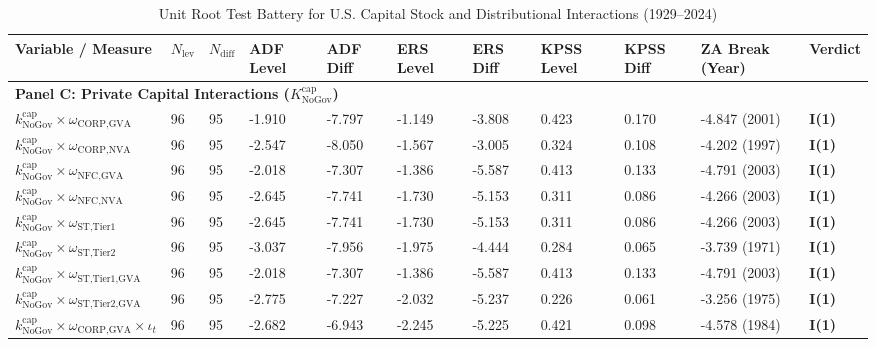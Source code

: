 \documentclass[11pt,a4paper]{article}
\begin{document}
\begin{landscape}
\begin{table}[h!]
\centering
\footnotesize
\caption{Unit Root Test Battery for U.S. Capital Stock and Distributional Interactions (1929--2024)}
\label{tab:urca_results_kcap}
\begin{tabular}{p{6.0cm} p{0.6cm} p{0.6cm} p{1.5cm} p{1.5cm} p{1.5cm} p{1.5cm} p{1.5cm} p{1.5cm} p{2.2cm} p{2.2cm}}
\toprule
\textbf{Variable / Measure} & \textbf{$N_{\text{lev}}$} & \textbf{$N_{\text{diff}}$} & \textbf{ADF Level} & \textbf{ADF Diff} & \textbf{ERS Level} & \textbf{ERS Diff} & \textbf{KPSS Level} & \textbf{KPSS Diff} & \textbf{ZA Break (Year)} & \textbf{Verdict} \\
\midrule
\multicolumn{11}{l}{\textbf{Panel C: Private Capital Interactions ($K^{\text{cap}}_{\text{NoGov}}$)}} \\
\midrule
$k^{\text{cap}}_{\text{NoGov}} \times \omega_{\text{CORP,GVA}}$ & 96 & 95 & -1.910 & -7.797 & -1.149 & -3.808 & 0.423 & 0.170 & -4.847 (2001) & \textbf{I(1)} \\
$k^{\text{cap}}_{\text{NoGov}} \times \omega_{\text{CORP,NVA}}$ & 96 & 95 & -2.547 & -8.050 & -1.567 & -3.005 & 0.324 & 0.108 & -4.202 (1997) & \textbf{I(1)} \\
$k^{\text{cap}}_{\text{NoGov}} \times \omega_{\text{NFC,GVA}}$ & 96 & 95 & -2.018 & -7.307 & -1.386 & -5.587 & 0.413 & 0.133 & -4.791 (2003) & \textbf{I(1)} \\
$k^{\text{cap}}_{\text{NoGov}} \times \omega_{\text{NFC,NVA}}$ & 96 & 95 & -2.645 & -7.741 & -1.730 & -5.153 & 0.311 & 0.086 & -4.266 (2003) & \textbf{I(1)} \\
$k^{\text{cap}}_{\text{NoGov}} \times \omega_{\text{ST,Tier1}}$ & 96 & 95 & -2.645 & -7.741 & -1.730 & -5.153 & 0.311 & 0.086 & -4.266 (2003) & \textbf{I(1)} \\
$k^{\text{cap}}_{\text{NoGov}} \times \omega_{\text{ST,Tier2}}$ & 96 & 95 & -3.037 & -7.956 & -1.975 & -4.444 & 0.284 & 0.065 & -3.739 (1971) & \textbf{I(1)} \\
$k^{\text{cap}}_{\text{NoGov}} \times \omega_{\text{ST,Tier1,GVA}}$ & 96 & 95 & -2.018 & -7.307 & -1.386 & -5.587 & 0.413 & 0.133 & -4.791 (2003) & \textbf{I(1)} \\
$k^{\text{cap}}_{\text{NoGov}} \times \omega_{\text{ST,Tier2,GVA}}$ & 96 & 95 & -2.775 & -7.227 & -2.032 & -5.237 & 0.226 & 0.061 & -3.256 (1975) & \textbf{I(1)} \\
$k^{\text{cap}}_{\text{NoGov}} \times \omega_{\text{CORP,GVA}} \times \iota_t$ & 96 & 95 & -2.682 & -6.943 & -2.245 & -5.225 & 0.421 & 0.098 & -4.578 (1984) & \textbf{I(1)} \\

\end{tabular}
\end{table}
\end{landscape}
\end{document}
